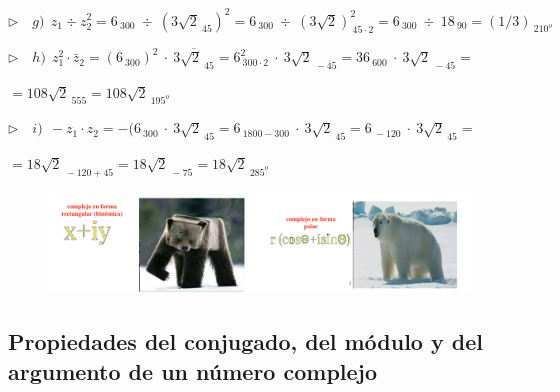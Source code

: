 \begin{miejercicio}
\vspace{6mm} $\triangleright \quad g)\ \ z_1\div z_2^2=6_{\ 300} \ \div \ (3\sqrt{2}_{\ 45})^2=6_{\ 300} \ \div \ (3\sqrt{2})^2_{\ 45\cdot 2}=
6_{\ 300} \ \div \ 18_{\ 90}= (1/3)_{\ 210^o}$



\vspace{6mm} $\triangleright \quad h)\ \ z_1^2 \cdot \bar z_2= (6_{\ 300})^2 \ \cdot \ \overline{ 3\sqrt{2}_{\ 45} }= 6^2_{\ 300\cdot 2} \ \cdot \ 3\sqrt{2}_{\ -45}=36_{\ 600 } \ \cdot \ 3\sqrt{2}_{\ -45}=$

\vspace{2mm}$=108\sqrt{2}_{\ 555}=108\sqrt{2}_{\ 195^o}$

\vspace{6mm} $\triangleright \quad i)\ \ -z_1\cdot z_2= -(6_{\ 300}\ \cdot \ 3\sqrt{2}_{\ 45}= 6_{\ 1800-300}\ \cdot \ 3\sqrt{2}_{\ 45} = 6_{\ -120}\ \cdot \ 3\sqrt{2}_{\ 45}=$

\vspace{2mm}$=18\sqrt{2}_{\ -120+45}= 18\sqrt{2}_{\ -75}=18\sqrt{2}_{\ 285^o}$

\vspace{1mm}
\end{miejercicio}

\vspace{1.5cm}
\begin{figure}[H]
	\centering
	\includegraphics[width=1\textwidth]{img-c/comp08h.png}
\end{figure}



\vspace{5mm}
\subsection{Propiedades del conjugado, del módulo y del argumento de un número complejo}
\vspace{0.5cm}

